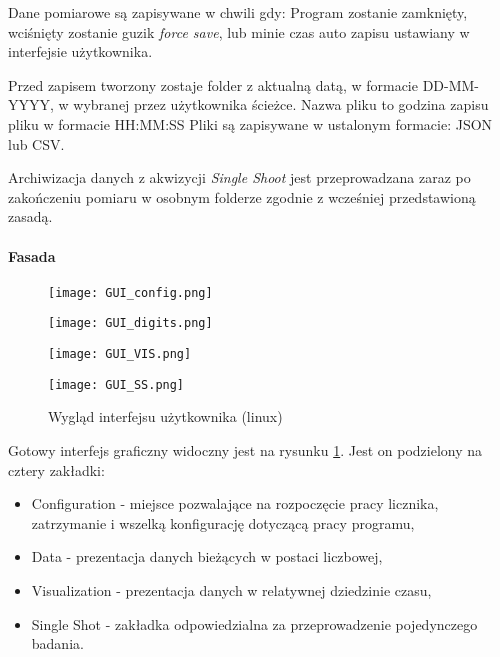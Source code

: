 Dane pomiarowe są zapisywane w chwili gdy: Program zostanie zamknięty, wciśnięty zostanie guzik \textit{force save}, lub minie czas auto zapisu ustawiany w interfejsie użytkownika. 

Przed zapisem tworzony zostaje folder z aktualną datą, w formacie DD-MM-YYYY, w wybranej przez użytkownika ścieżce. Nazwa pliku to godzina zapisu pliku w formacie HH:MM:SS
Pliki są zapisywane w ustalonym formacie: JSON lub CSV.

Archiwizacja danych z akwizycji \textit{Single Shoot} jest przeprowadzana zaraz po zakończeniu pomiaru w osobnym folderze zgodnie z wcześniej przedstawioną zasadą. 

\paragraph{Fasada}
\begin{figure}
        \begin{multicols}{2}
        
        \texttt{[image: GUI\_config.png]}\par
        
        
        \texttt{[image: GUI\_digits.png]}\par
        
        
        \end{multicols}\hfill
        
        \begin{multicols}{2}
        
        
        \texttt{[image: GUI\_VIS.png]}\par
        
        
        \texttt{[image: GUI\_SS.png]}\par
        
        \end{multicols}
        \caption{Wygląd interfejsu użytkownika (linux)}
        \label{Gui pic}
        \end{figure}

Gotowy interfejs graficzny widoczny jest na rysunku \ref{Gui pic}. Jest on podzielony na cztery zakładki:
\begin{itemize}
        \item Configuration - miejsce pozwalające na rozpoczęcie pracy licznika, zatrzymanie i wszelką konfigurację dotyczącą pracy programu, 
        \item Data - prezentacja danych bieżących w postaci liczbowej, 
        \item Visualization - prezentacja danych w relatywnej dziedzinie czasu,
        \item Single Shot - zakładka odpowiedzialna za przeprowadzenie pojedynczego badania.
\end{itemize}

